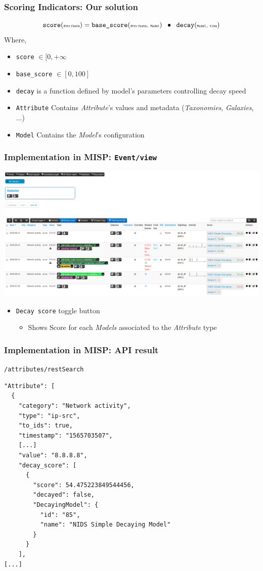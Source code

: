 \begin{frame}
    \frametitle{Scoring Indicators: Our solution}
    $$ \texttt{score}(\texttt{\tiny Attribute}) = \texttt{base\_score}(\texttt{\tiny Attribute, Model}) \;\;\bullet\;\; \texttt{decay}(\texttt{\tiny Model, time}) $$
    Where,\vspace{0.5cm}
    \begin{itemize}
        \item \texttt{score} $ \in [0, +\infty $
        \item \texttt{base\_score} $ \in [0, 100] $
        \item \texttt{decay} is a function defined by model's parameters controlling decay speed
        \item \texttt{Attribute} Contains \textit{Attribute}'s values and metadata {\scriptsize (\textit{Taxonomies}, \textit{Galaxies}, ...)}
        \item \texttt{Model} Contains the \textit{Model}'s configuration
    \end{itemize}
\end{frame}

\begin{frame}
    \frametitle{Implementation in MISP: \texttt{Event/view}}
    \includegraphics[width=1.00\linewidth]{decaying-event.png}
    \begin{itemize}
        \item \texttt{Decay score} toggle button
        \begin{itemize}
            \item Shows Score for each \textit{Models} associated to the \textit{Attribute} type
        \end{itemize}
    \end{itemize}
\end{frame}

\begin{frame}[fragile]
    \frametitle{Implementation in MISP: API result}
    \texttt{/attributes/restSearch}
    \begin{lstlisting}
"Attribute": [
  {
    "category": "Network activity",
    "type": "ip-src",
    "to_ids": true,
    "timestamp": "1565703507",
    [...]
    "value": "8.8.8.8",
    "decay_score": [
      {
        "score": 54.475223849544456,
        "decayed": false,
        "DecayingModel": {
          "id": "85",
          "name": "NIDS Simple Decaying Model"
        }
      }
    ],
[...]
    \end{lstlisting}
\end{frame}


